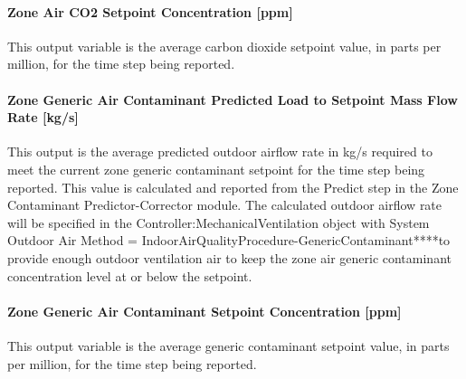 \paragraph{Zone Air CO2 Setpoint Concentration {[}ppm{]}}\label{zone-air-co2-setpoint-concentration-ppm}

This output variable is the average carbon dioxide setpoint value, in parts per million, for the time step being reported.

\paragraph{Zone Generic Air Contaminant Predicted Load to Setpoint Mass Flow Rate {[}kg/s{]}}\label{zone-generic-air-contaminant-predicted-load-to-setpoint-mass-flow-rate-kgs}

This output is the average predicted outdoor airflow rate in kg/s required to meet the current zone generic contaminant setpoint for the time step being reported. This value is calculated and reported from the Predict step in the Zone Contaminant Predictor-Corrector module. The calculated outdoor airflow rate will be specified in the Controller:MechanicalVentilation object with System Outdoor Air Method = IndoorAirQualityProcedure-GenericContaminant****to provide enough outdoor ventilation air to keep the zone air generic contaminant concentration level at or below the setpoint.

\paragraph{Zone Generic Air Contaminant Setpoint Concentration {[}ppm{]}}\label{zone-generic-air-contaminant-setpoint-concentration-ppm}

This output variable is the average generic contaminant setpoint value, in parts per million, for the time step being reported.
